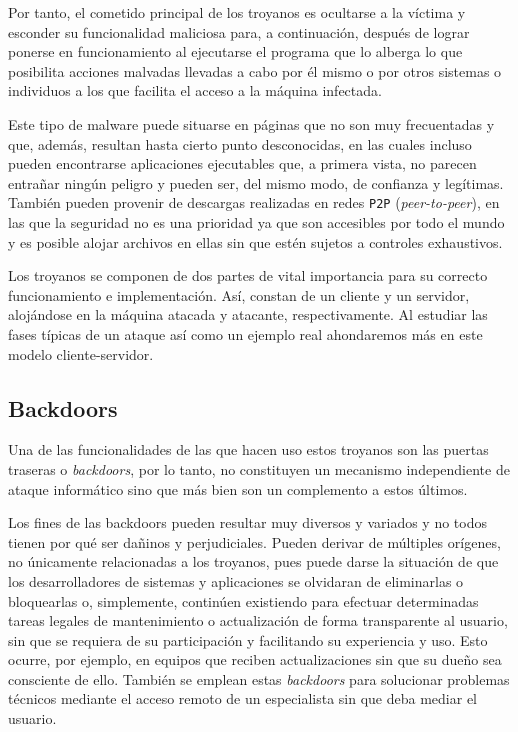 \documentclass[12pt]{article}
\newcommand{\newpar} {
    \vskip 0.5cm
}
\begin{document}
            \newpar

            Por tanto, el cometido principal de los troyanos es ocultarse a la víctima y esconder su funcionalidad maliciosa para, a continuación, después de lograr ponerse en funcionamiento al ejecutarse el programa que lo alberga lo que posibilita acciones malvadas llevadas a cabo por él mismo o por otros sistemas o individuos a los que facilita el acceso a la máquina infectada.

            \newpar

            Este tipo de malware puede situarse en páginas que no son muy frecuentadas y que, además, resultan hasta cierto punto desconocidas, en las cuales incluso pueden encontrarse aplicaciones ejecutables que, a primera vista, no parecen entrañar ningún peligro y pueden ser, del mismo modo, de confianza y legítimas. También pueden provenir de descargas realizadas en redes \texttt{P2P} (\textit{peer-to-peer}), en las que la seguridad no es una prioridad ya que son accesibles por todo el mundo y es posible alojar archivos en ellas sin que estén sujetos a controles exhaustivos.

            \newpar

            Los troyanos se componen de dos partes de vital importancia para su correcto funcionamiento e implementación. Así, constan de un cliente y un servidor, alojándose en la máquina atacada y atacante, respectivamente. Al estudiar las fases típicas de un ataque así como un ejemplo real ahondaremos más en este modelo cliente-servidor.

        \subsection{Backdoors}
            Una de las funcionalidades de las que hacen uso estos troyanos son las puertas traseras o \textit{backdoors}, por lo tanto, no constituyen un mecanismo independiente de ataque informático sino que más bien son un complemento a estos últimos.

            \newpar

            Los fines de las backdoors pueden resultar muy diversos y variados y no todos tienen por qué ser dañinos y perjudiciales. Pueden derivar de múltiples orígenes, no únicamente relacionadas a los troyanos, pues puede darse la situación de que los desarrolladores de sistemas y aplicaciones se olvidaran de eliminarlas o bloquearlas o, simplemente, continúen existiendo para efectuar determinadas tareas legales de mantenimiento o actualización de forma transparente al usuario, sin que se requiera de su participación y facilitando su experiencia y uso. Esto ocurre, por ejemplo, en equipos que reciben actualizaciones sin que su dueño sea consciente de ello. También se emplean estas \textit{backdoors} para solucionar problemas técnicos mediante el acceso remoto de un especialista sin que deba mediar el usuario.
\end{document}
